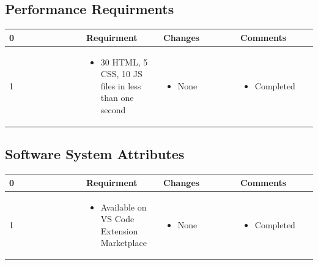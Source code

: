 \documentclass[letterpaper,10pt,titlepage,draftclsnofoot,onecolumn,onesided] {IEEEtran}
\begin{document}
\subsection{Performance Requirments}
\small{
\begin{center}
	\begin{singlespace}
		\begin{tabular}{ |  p{0.25\linewidth}  |  p{0.25\linewidth}  | p{0.25\linewidth} | p{0.25\linewidth} |}
		\hline
		0 & Requirment & Changes & Comments \\ \hline
		
			1
		& 
			\begin{itemize}
				\item 30 HTML, 5 CSS, 10 JS files in less than one second
			\end{itemize}
		& 
			\begin{itemize}
				\item None
			\end{itemize}
		&
			\begin{itemize}
				\item Completed
			\end{itemize} 
		
        \\ \hline

		\end{tabular}
	\end{singlespace}
\end{center}
}


\subsection{Software System Attributes}
\small{
\begin{center}
	\begin{singlespace}
		\begin{tabular}{ |  p{0.25\linewidth}  |  p{0.25\linewidth}  | p{0.25\linewidth} | p{0.25\linewidth} |}
		\hline
		0 & Requirment & Changes & Comments \\ \hline
		
			1
		& 
			\begin{itemize}
				\item Available on VS Code Extension Marketplace
			\end{itemize}
		& 
			\begin{itemize}
				\item None
			\end{itemize}
		&
			\begin{itemize}
				\item Completed
			\end{itemize} 
		
        \\ \hline

		\end{tabular}
	\end{singlespace}
\end{center}
}
\end{document}

